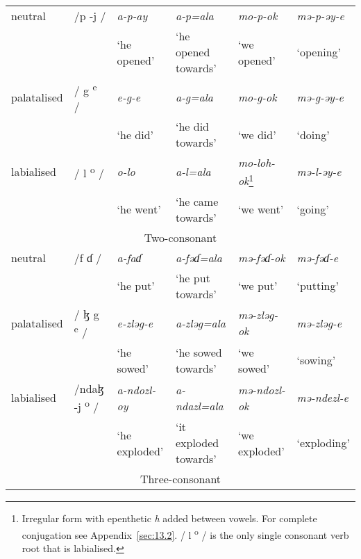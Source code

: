 \begin{table}
{\begin{tabular}{lp{2cm}lp{3.25cm}p{2.5cm}p{2.5cm}}
neutral   & /p -j /      & \textit{a-p-ay}  &  \textit{a-p=ala}  & \textit{mo-p-ok}   &  \textit{mə-p-əy-e}\\
          &          &  ‘he opened’ &            ‘he opened towards’     &    ‘we opened’ & ‘opening’ \\
palatalised & / g\textsuperscript{ e} /& \textit{e-g-e}   &  \textit{a-g=ala}    & \textit{mo-g-ok} & \textit{mə-g-əy-e}\\
	  &	   & ‘he did’ &‘he did towards’        &  ‘we did’ & ‘doing’\\
labialised & / l\textsuperscript{  o} / &    \textit{o-lo}     &    \textit{a-l=ala} &  \textit{mo-loh-ok}\footnote{Irregular form with epenthetic \textit{h} added between vowels. For complete conjugation see Appendix~\ref{sec:13.2}. / l \textsuperscript{o} / is the only single consonant verb root that is labialised.} & \textit{mə-l-əy-e}\\
	   &				&  ‘he went’             & ‘he came towards’ &    ‘we went’ &  ‘going’\\
\midrule
\multicolumn{6}{c}{Two-consonant}\\\midrule               
neutral     & /f  ɗ /    & \textit{a-fa}\textit{ɗ} & \textit{a-fəɗ=ala}           & \textit{mə-fəɗ-ok}    & \textit{mə-fəɗ-e}\\
            &    &  ‘he put’              &  ‘he put towards’           & ‘we put’    & ‘putting’\\
palatalised &  / ɮ g\textsuperscript{ e} /    &  \textit{e-zləg-e}     &  \textit{a-zləg=ala} & \textit{mə-zləg-ok} & \textit{mə-zləg-e}\\
            &                                 &  ‘he sowed’              &  ‘he sowed towards’           & ‘we sowed’    & ‘sowing’\\
labialised  &  /ndaɮ -j\textsuperscript{ o} / &  \textit{a-ndozl-oy}  &  \textit{a-ndazl=ala}  & \textit{mə-ndozl-ok}  & \textit{mə-ndezl-e}\\
            &                                 &  ‘he exploded’          &  ‘it exploded towards’       & ‘we exploded’  & ‘exploding’\\
\midrule
\multicolumn{6}{c}{Three-consonant}\\\midrule


\end{tabular}}
\end{table}
